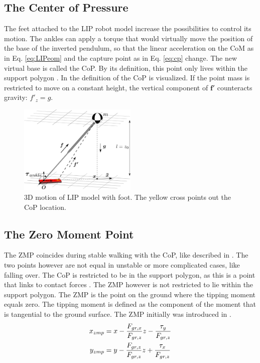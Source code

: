 \subsection{The Center of Pressure}
The feet attached to the \ac{LIP} robot model increase the possibilities to control its motion. The ankles can apply a torque that would virtually move the position of the base of the inverted pendulum, so that the linear acceleration on the \ac{CoM} as in Eq. \eqref{eq:LIPeom} and the capture point as in Eq. \eqref{eq:cp} change. The new virtual base is called the \ac{CoP}. By its definition, this point only lives within the support polygon \cite{vukobratovic2004zero}. In  the definition of the \ac{CoP} is visualized. If the point mass is restricted to move on a constant height, the vertical component of $\boldsymbol{f'}$ counteracts gravity: $f'_z=g$. 
\begin{figure}[h]
\centering
\includegraphics[width=0.5\textwidth]{STYLESTUFF/3DCoMwithfoot.png}
\caption{\ac{3D} motion of \ac{LIP} model with foot. The yellow cross points out the \ac{CoP} location.}
\label{fig:3dlipfoot}
\end{figure}

\subsection{The Zero Moment Point}
The \ac{ZMP} coincides during stable walking with the \ac{CoP}, like described in \cite{vukobratovic2004zero}. The two points however are not equal in unstable or more complicated cases, like falling over.  The \ac{CoP} is restricted to be in the support polygon, as this is a point that links to contact forces \cite{sardain2004forces}. The \ac{ZMP} however is not restricted to lie within the support polygon. The \ac{ZMP} is the point on the ground where the tipping moment equals zero. The tipping moment is defined as the component of the moment that is tangential to the ground surface. The \ac{ZMP} initially was introduced in \cite{vukobratovic1969contribution}.
\begin{align}
    x_{zmp}&=x-\frac{F_{gr,x}}{F_{gr,z}}z-\frac{\tau_y}{F_{gr,z}}\\
    y_{zmp}&=y-\frac{F_{gr,z}}{F_{gr,z}}z+\frac{\tau_x}{F_{gr,z}}
\end{align}

